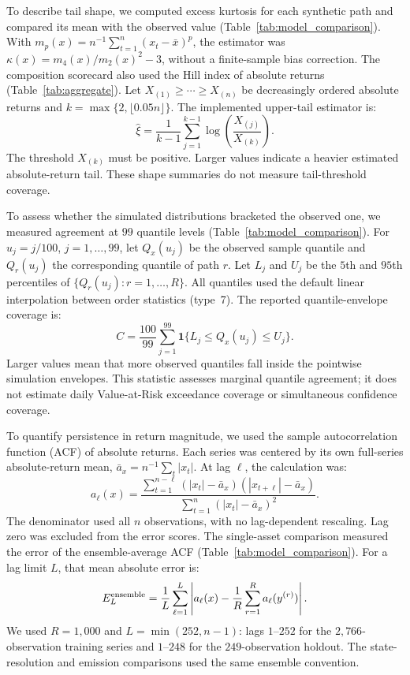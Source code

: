 To describe tail shape, we computed excess kurtosis for each
synthetic path and compared its mean with the observed value
(Table~\ref{tab:model_comparison}). With
$m_p(x)=n^{-1}\sum_{t=1}^{n}(x_t-\bar x)^p$, the estimator was
$\kappa(x)=m_4(x)/m_2(x)^2-3$, without a finite-sample bias
correction. The composition scorecard also used the Hill index of
absolute returns (Table~\ref{tab:aggregate}). Let
$X_{(1)}\ge\cdots\ge X_{(n)}$ be decreasingly ordered absolute
returns and $k=\max\{2,\lfloor0.05n\rfloor\}$. The implemented
upper-tail estimator is:
\begin{equation}
 \hat\xi=\frac{1}{k-1}\sum_{j=1}^{k-1}
             \log\!\left(\frac{X_{(j)}}{X_{(k)}}\right).
 \label{eq:hill}
\end{equation}
The threshold $X_{(k)}$ must be positive. Larger values indicate a
heavier estimated absolute-return tail. These shape summaries do
not measure tail-threshold coverage.

To assess whether the simulated distributions bracketed the observed
one, we measured agreement at $99$ quantile levels
(Table~\ref{tab:model_comparison}). For $u_j=j/100$, $j=1,\ldots,99$,
let $Q_x(u_j)$ be the observed sample quantile and
$Q_r(u_j)$ the corresponding quantile of path $r$. Let
$L_j$ and $U_j$ be the $5$th and $95$th percentiles of
$\{Q_r(u_j):r=1,\ldots,R\}$. All quantiles used the default linear
interpolation between order statistics (type~7). The reported
quantile-envelope coverage is:
\begin{equation}
 C=\frac{100}{99}\sum_{j=1}^{99}
       \mathbf{1}\{L_j\le Q_x(u_j)\le U_j\}.
 \label{eq:quantile-envelope-coverage}
\end{equation}
Larger values mean that more observed quantiles fall inside the
pointwise simulation envelopes. This statistic assesses marginal
quantile agreement; it does not estimate daily Value-at-Risk
exceedance coverage or simultaneous confidence coverage.

To quantify persistence in return magnitude, we used the sample
autocorrelation function (ACF) of absolute returns. Each series was
centered by its own full-series absolute-return mean,
$\bar a_x=n^{-1}\sum_t|x_t|$. At lag $\ell$, the calculation was:
\begin{equation}
 a_\ell(x)=
 \frac{\sum_{t=1}^{n-\ell}(|x_t|-\bar a_x)(|x_{t+\ell}|-\bar a_x)}
      {\sum_{t=1}^{n}(|x_t|-\bar a_x)^2}.
 \label{eq:sample-absolute-acf}
\end{equation}
The denominator used all $n$ observations, with no lag-dependent
rescaling. Lag zero was excluded from the error scores.
The single-asset comparison measured the error of the ensemble-average
ACF (Table~\ref{tab:model_comparison}). For a lag limit $L$, that
mean absolute error is:
\begin{equation}
 E^{\rm ensemble}_L=\frac{1}{L}\sum_{\ell=1}^{L}
 \left|a_\ell(x)-\frac{1}{R}\sum_{r=1}^{R}a_\ell(y^{(r)})\right|.
 \label{eq:acf-ensemble-error}
\end{equation}
We used $R=1{,}000$ and $L=\min(252,n-1)$: lags $1$--$252$
for the $2{,}766$-observation training series and $1$--$248$ for the
$249$-observation holdout. The state-resolution and emission
comparisons used the same ensemble convention.

